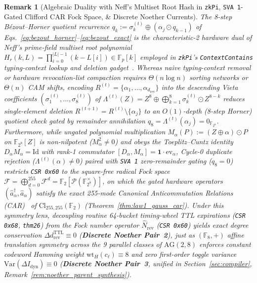 \documentclass[11pt,letterpaper]{article}
\theoremstyle{spectralthm}
\newtheorem{remark}[theorem]{Remark}
\begin{document}
\begin{remark}[Algebraic Duality with Neff's Multiset Root Hash in \texttt{zkPi}, \texttt{SVA~1\textquotesingle}-Gated Clifford CAR Fock Space, \& Discrete Noether Currents]
\label{rem:neff_zkpi_duality}
The 8-step B\'{e}zout--Horner quotient recurrence $q_k := \sigma_k^{(t)} \oplus (\alpha_j \odot q_{k-1})$ of Eqs.~\eqref{eq:bezout_horner}--\eqref{eq:bezout_exact} is the characteristic-2 hardware dual of Neff's prime-field multiset root polynomial $H_r(k,L) = \prod_{i=0}^{|L|-1}(k - L[i]) \in \mathbb{F}_p[k]$ employed in \texttt{zkPi}'s \texttt{ContextContains} typing-context lookup and deletion gadget~\cite{laufer2024zkpi, neff2001verifiable}. Whereas naive typing-context removal or hardware revocation-list compaction requires $\Theta(n\log n)$ sorting networks or $\Theta(n)$ CAM shifts, encoding $R^{(t)} = \{\alpha_1,\dots,\alpha_{d_{\mathrm{rev}}}\}$ into the descending Vieta coefficients $(\sigma_1^{(t)},\dots,\sigma_8^{(t)})$ of $\Lambda^{(t)}(Z) = Z^8 \oplus \bigoplus_{k=1}^8 \sigma_k^{(t)} \odot Z^{8-k}$ reduces single-element deletion $R^{(t+1)} = R^{(t)} \setminus \{\alpha_j\}$ to an $O(1)$-depth (8-step Horner) quotient check gated by remainder annihilation $q_8 = \Lambda^{(t)}(\alpha_j) = 0_{\mathbb{F}_{2^8}}$. Furthermore, while ungated polynomial multiplication $M_\alpha(P) := (Z\oplus\alpha)\odot P$ on $\mathbb{F}_{2^8}[Z]$ is non-nilpotent ($M_\alpha^2 \neq 0$) and obeys the Toeplitz--Cuntz identity~\cite{cuntz1977simple} $D_\alpha M_\alpha = \mathrm{Id}$ with rank-1 commutator $[D_\alpha,M_\alpha] = \mathbf{1}\cdot\mathrm{ev}_\alpha$, Cycle-0 duplicate rejection ($\Lambda^{(t)}(\alpha)\neq 0$) paired with \texttt{SVA~1\textquotesingle} zero-remainder gating ($q_8 = 0$) restricts \texttt{CSR 0x60} to the square-free radical Fock space $\mathcal{F} = \bigoplus_{d=0}^{255}\mathcal{F}^d = \mathbb{F}_2[\mathcal{P}(\mathbb{F}_{2^8}^\times)]$, on which the gated hardware operators $(\hat{a}_\alpha^\dagger, \hat{a}_\alpha)$ satisfy the exact 255-mode Canonical Anticommutation Relations (CAR)~\cite{jordan1928pauli} of $\mathrm{Cl}_{255,255}(\mathbb{F}_2)$ (Theorem~\ref{thm:law1_gauss_car}). Under this symmetry lens, decoupling routine 64-bucket timing-wheel TTL expirations (\texttt{CSR 0x68}, \texttt{thm26}) from the Fock number operator $\hat{N}_{\mathrm{rev}}$ (\texttt{CSR 0x60}) yields exact degree conservation $\Delta d_{\mathrm{rev}}^{\mathrm{TTL}} \equiv 0$ (\textbf{Discrete Noether Pair~2}), just as $(\mathbb{F}_8,+)$ affine translation symmetry across the 9 parallel classes of $\mathrm{AG}(2,8)$ enforces constant codeword Hamming weight $\mathrm{wt}_H(c_\ell)\equiv 8$ and zero first-order toggle variance $\mathrm{Var}(\Delta I_{\mathrm{dyn}})\equiv 0$ (\textbf{Discrete Noether Pair~3}, unified in Section~\ref{sec:compiler}, Remark~\ref{rem:noether_parent_synthesis}).
\end{remark}
\end{document}
